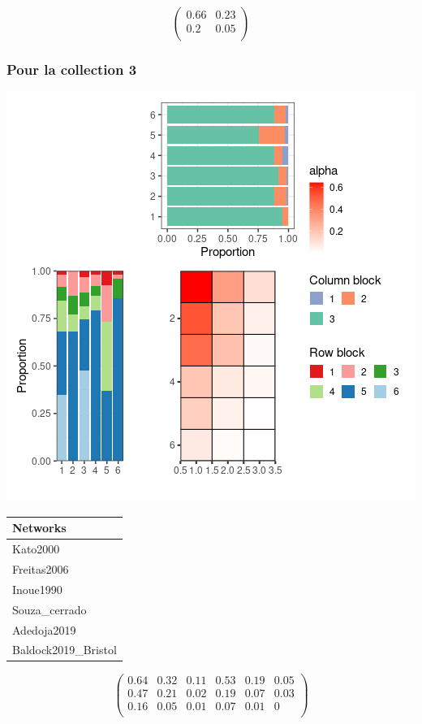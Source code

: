 \normalsize\newline\[\begin{pmatrix} 0.66 &0.23 \\0.2 &0.05 \\ \end{pmatrix}\]

\subsubsection{Pour la collection 3 }

\includegraphics{./img/b8abb8188b0bc33c6f0544fed1eb1ff74aac349a.png}\newline \tiny

\begin{tabular}{l}
\toprule
Networks\\
\midrule
Kato2000\\
Freitas2006\\
Inoue1990\\
Souza\_cerrado\\
Adedoja2019\\
\addlinespace
Baldock2019\_Bristol\\
\bottomrule
\end{tabular}

\normalsize\newline\[\begin{pmatrix} 0.64 &0.32 &0.11 &0.53 &0.19 &0.05 \\0.47 &0.21 &0.02 &0.19 &0.07 &0.03 \\0.16 &0.05 &0.01 &0.07 &0.01 &0 \\ \end{pmatrix}\]

